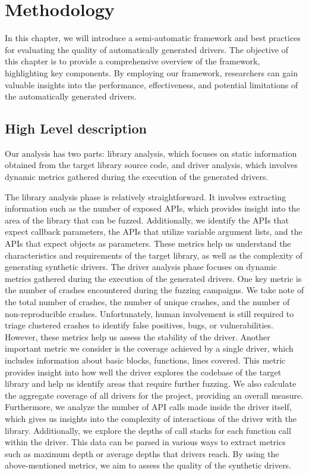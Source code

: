 \documentclass[a4paper,11pt,oneside]{report}
\begin{document}
\chapter{Methodology}

In this chapter, we will introduce a semi-automatic framework and best 
practices for evaluating the quality of automatically generated drivers. 
The objective of this chapter is to provide a comprehensive overview of
the framework, highlighting key components. By employing our framework,
researchers can gain valuable insights into the performance, effectiveness, 
and potential limitations of the automatically generated drivers. 


\section{High Level description}
Our analysis has two parts: library analysis, which focuses on static information
obtained from the target library source code, and driver analysis, which involves
dynamic metrics gathered during the execution of the generated drivers.

The library analysis phase is relatively straightforward. It involves extracting
information such as the number of exposed APIs, which provides insight into the area
of the library that can be fuzzed. Additionally, we identify the 
APIs that expect callback parameters, the APIs that utilize
variable argument lists, and the APIs that expect objects as parameters.
These metrics help us understand the characteristics and requirements of the
target library, as well as the complexity of generating synthetic drivers.
The driver analysis phase focuses on dynamic metrics gathered during 
the execution of the generated drivers. One key metric is the 
number of crashes encountered during the fuzzing campaigns. We take  
note of the total number of crashes, the number of unique crashes, 
and the number of non-reproducible crashes. Unfortunately, human 
involvement is still required to triage clustered crashes to identify 
false positives, bugs, or vulnerabilities. However, these metrics help
us assess the stability of the driver. 
Another important metric we consider is the coverage achieved by 
a single driver, which includes information about basic blocks, 
functions, lines covered. This metric provides insight into how
well the driver explores the codebase of the target library 
and help us identify areas that require further fuzzing. 
We also calculate the aggregate coverage of all drivers for the project, 
providing an overall measure. 
Furthermore, we analyze the number of API calls made inside the 
driver itself, which gives us insights into the complexity of interactions 
of the driver with the library.
Additionally, we explore the depths of call stacks for each function
call within the driver. This data can be parsed in various ways to
extract metrics such as maximum depth or average depths that drivers
reach. By using the above-mentioned metrics, we aim to assess the quality of
the synthetic drivers. 
\end{document}
